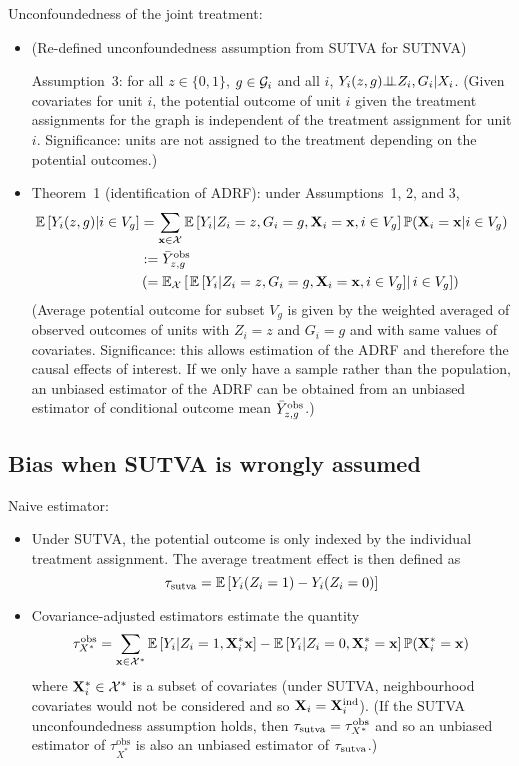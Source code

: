 \documentclass[10pt]{article}
\begin{document}
Unconfoundedness of the joint treatment:

\begin{itemize}

\item
(Re-defined unconfoundedness assumption from SUTVA for SUTNVA)

Assumption~3: for all $z\in\{0,1\}$, $g\in\mathcal{G}_i$ and all $i$, $Y_i(z,g){\perp\!\!\!\perp} Z_i, G_i|X_i$. (Given covariates for unit $i$, the potential outcome of unit $i$ given the treatment assignments for the graph is independent of the treatment assignment for unit $i$. Significance: units are not assigned to the treatment depending on the potential outcomes.)

\item
Theorem~1 (identification of ADRF): under Assumptions~1, 2, and 3,
\begin{align*}
\mathbb{E}\left[Y_i(z,g)|i\in V_g\right] &= \sum_{\mathbf{x}\in\mathcal{X}}\mathbb{E}\left[Y_i|Z_i=z,G_i=g,\mathbf{X}_i=\mathbf{x},i\in V_g\right]\mathbb{P}(\mathbf{X}_i=\mathbf{x}|i\in V_g) \\
& := \bar{Y}^{\text{obs}}_{z,g} \\
&\left(= \mathbb{E}_{\mathcal{X}}\left[\left.\mathbb{E}\left[Y_i|Z_i=z,G_i=g,\mathbf{X}_i=\mathbf{x},i\in V_g\right]\right|i\in V_g\right]\right)
\end{align*}
(Average potential outcome for subset $V_g$ is given by the weighted averaged of observed outcomes of units with $Z_i=z$ and $G_i=g$ and with same values of covariates. Significance: this allows estimation of the ADRF and therefore the causal effects of interest. If we only have a sample rather than the population, an unbiased estimator of the ADRF can be obtained from an unbiased estimator of conditional outcome mean $\bar{Y}^{\text{obs}}_{z,g}$.)

\end{itemize}

\subsection{Bias when SUTVA is wrongly assumed}

Naive estimator:

\begin{itemize}

\item
Under SUTVA, the potential outcome is only indexed by the individual treatment assignment. The average treatment effect is then defined as
\[
\tau_\text{sutva} = \mathbb{E}\left[Y_i(Z_i=1) - Y_i(Z_i=0)\right]
\]

\item
Covariance-adjusted estimators estimate the quantity
\[
\tau_{X^*}^\text{obs} = \sum_{\mathbf{x}\in\mathcal{X}^*}\mathbb{E}\left[Y_i|Z_i=1,\mathbf{X}_i^*\mathbf{x}\right] - \mathbb{E}\left[Y_i|Z_i=0,\mathbf{X}_i^*=\mathbf{x}\right]\mathbb{P}(\mathbf{X}_i^*=\mathbf{x})
\]
where $\mathbf{X}_i^*\in\mathcal{X}^*$ is a subset of covariates (under SUTVA, neighbourhood covariates would not be considered and so $\mathbf{X}_i=\mathbf{X}^{\text{ind}}_i$). (If the SUTVA unconfoundedness assumption holds, then $\tau_\text{sutva}=\tau_{X^*}^\text{obs}$ and so an unbiased estimator of $\tau_{X^*}^\text{obs}$ is also an unbiased estimator of $\tau_\text{sutva}$.)

\end{itemize}
\end{document}
